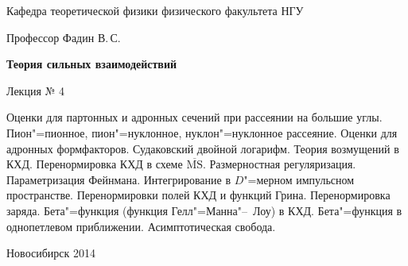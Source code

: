 \documentclass[12pt,pagesize,paper=landscape,paper=192mm:108mm]{scrbook}
\begin{document}
\begin{titlepage}
\begin{center}
    Кафедра теоретической физики физического факультета НГУ
    \medskip

    \Large
    Профессор Фадин В.\,С.

    \huge
    \textbf{Теория сильных взаимодействий}
    \smallskip
    
    \Large
    Лекция № 4
    \vfill
    
    \normalsize
    \begin{minipage}{0.9\linewidth}
      Оценки для партонных и адронных сечений при рассеянии на большие
      углы. Пион"=пионное, пион"=нуклонное, нуклон"=нуклонное
      рассеяние. Оценки для адронных формфакторов. Судаковский двойной
      логарифм. Теория возмущений в КХД. Перенормировка КХД в схеме
      $\overline{\text{MS}}$. Размерностная регуляризация. Параметризация
      Фейнмана. Интегрирование в $D$"=мерном импульсном
      пространстве. Перенормировки полей КХД и функций
      Грина. Перенормировка заряда. Бета"=функция (функция
      Гелл"=Манна"--~Лоу) в КХД. Бета"=функция в однопетлевом
      приближении. Асимптотическая свобода.
    \end{minipage}
    \vfill
    
    \normalsize \ccbysa\hspace{0.5em}  Новосибирск 2014   
  \end{center}
\end{titlepage}
\end{document}

